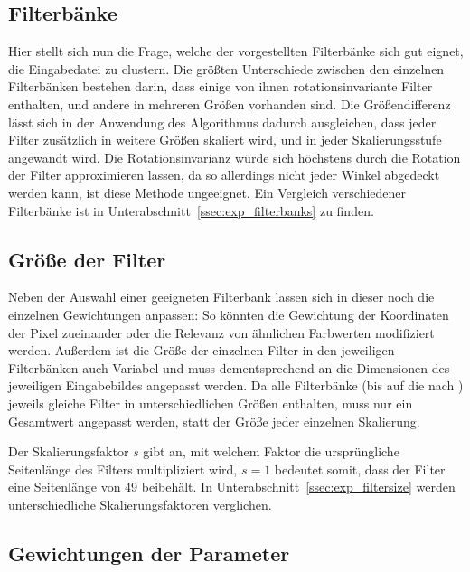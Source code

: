 \subsection{Filterbänke}
\label{ssec:initialization_filterbanks}
Hier stellt sich nun die Frage, welche der vorgestellten Filterbänke sich gut eignet, die Eingabedatei zu clustern. Die größten Unterschiede zwischen den einzelnen Filterbänken bestehen darin, dass einige von ihnen rotationsinvariante Filter enthalten, und andere in mehreren Größen vorhanden sind. Die Größendifferenz lässt sich in der Anwendung des Algorithmus dadurch ausgleichen, dass jeder Filter zusätzlich in weitere Größen skaliert wird, und in jeder Skalierungsstufe angewandt wird. Die Rotationsinvarianz würde sich höchstens durch die Rotation der Filter approximieren lassen, da so allerdings nicht jeder Winkel abgedeckt werden kann, ist diese Methode ungeeignet. Ein Vergleich verschiedener Filterbänke ist in Unterabschnitt~\ref{ssec:exp_filterbanks} zu finden.

\subsection{Größe der Filter}
\label{ssec:initialization_filtersize}

Neben der Auswahl einer geeigneten Filterbank lassen sich in dieser noch die einzelnen Gewichtungen anpassen: So könnten \zB die Gewichtung der Koordinaten der Pixel zueinander oder die Relevanz von ähnlichen Farbwerten modifiziert werden. Außerdem ist die Größe der einzelnen Filter in den jeweiligen Filterbänken auch Variabel und muss dementsprechend an die Dimensionen des jeweiligen Eingabebildes angepasst werden. Da alle Filterbänke (bis auf die nach \cite{jain_91}) jeweils gleiche Filter in unterschiedlichen Größen enthalten, muss nur ein Gesamtwert angepasst werden, statt der Größe jeder einzelnen Skalierung. 

Der Skalierungsfaktor $s$ gibt an, mit welchem Faktor die ursprüngliche Seitenlänge des Filters multipliziert wird, $s=1$ bedeutet somit, dass der Filter eine Seitenlänge von \SI{49}{\pixel} beibehält. In Unterabschnitt~\ref{ssec:exp_filtersize} werden unterschiedliche Skalierungsfaktoren verglichen.

\subsection{Gewichtungen der Parameter}
\label{ssec:initialization_filterweight}

